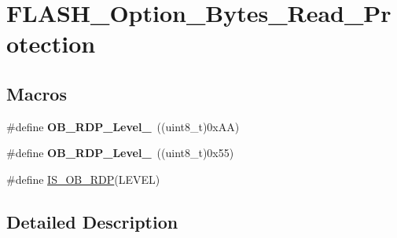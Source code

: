 \hypertarget{group___f_l_a_s_h___option___bytes___read___protection}{\section{F\-L\-A\-S\-H\-\_\-\-Option\-\_\-\-Bytes\-\_\-\-Read\-\_\-\-Protection}
\label{group___f_l_a_s_h___option___bytes___read___protection}
}
\subsection*{Macros}
\begin{DoxyCompactItemize}
\item 
\hypertarget{group___f_l_a_s_h___option___bytes___read___protection_gae0417128469ebd025ef619bb9bd28271}{\#define {\bfseries O\-B\-\_\-\-R\-D\-P\-\_\-\-Level\-\_}~((uint8\-\_\-t)0x\-A\-A)}\label{group___f_l_a_s_h___option___bytes___read___protection_gae0417128469ebd025ef619bb9bd28271}

\item 
\hypertarget{group___f_l_a_s_h___option___bytes___read___protection_gaeee87887410dcc3d47f0e6416f1d49d5}{\#define {\bfseries O\-B\-\_\-\-R\-D\-P\-\_\-\-Level\-\_}~((uint8\-\_\-t)0x55)}\label{group___f_l_a_s_h___option___bytes___read___protection_gaeee87887410dcc3d47f0e6416f1d49d5}

\item 
\#define \hyperlink{group___f_l_a_s_h___option___bytes___read___protection_ga9f6200da3a5294668e1b24b65f85b34a}{I\-S\-\_\-\-O\-B\-\_\-\-R\-D\-P}(L\-E\-V\-E\-L)
\end{DoxyCompactItemize}


\subsection{Detailed Description}


